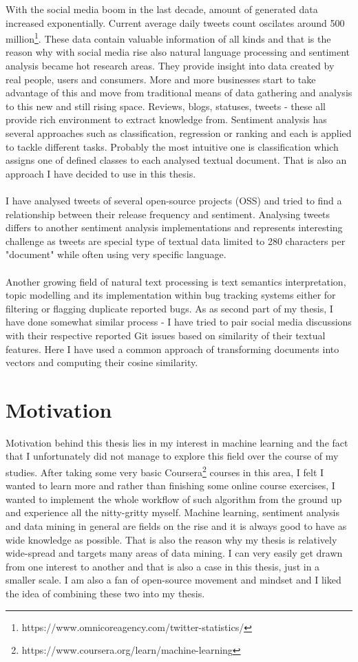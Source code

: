 With the social media boom in the last decade, amount of generated data increased exponentially. Current average daily tweets count oscilates around 500 million\footnote{https://www.omnicoreagency.com/twitter-statistics/}. These data contain valuable information of all kinds and that is the reason why with social media rise also natural language processing and sentiment analysis became hot research areas. They provide insight into data created by real people, users and consumers. More and more businesses start to take advantage of this and move from traditional means of data gathering and analysis to this new and still rising space. Reviews, blogs, statuses, tweets - these all provide rich environment to extract knowledge from.
Sentiment analysis has several approaches such as classification, regression or ranking and each is applied to tackle different tasks. Probably the most intuitive one is classification which assigns one of defined classes to each analysed textual document. That is also an approach I have decided to use in this thesis. \\
\\
I have analysed tweets of several open-source projects (OSS) and tried to find a relationship between their release frequency and sentiment. Analysing tweets differs to another sentiment analysis implementations and represents interesting challenge as tweets are special type of textual data limited to 280 characters per "document" while often using very specific language.\\
\\
Another growing field of natural text processing is text semantics interpretation, topic modelling and its implementation within bug tracking systems either for filtering or flagging duplicate reported bugs. As as second part of my thesis, I have done somewhat similar process - I have tried to pair social media discussions with their respective reported Git issues based on similarity of their textual features. Here I have used a common approach of transforming documents into vectors and computing their cosine similarity.

\section{Motivation}
Motivation behind this thesis lies in my interest in machine learning and the fact that I unfortunately did not manage to explore this field over the course of my studies. After taking some very basic Coursera\footnote{https://www.coursera.org/learn/machine-learning} courses in this area, I felt I wanted to learn more and rather than finishing some online course exercises, I wanted to implement the whole workflow of such algorithm from the ground up and experience all the nitty-gritty myself. Machine learning, sentiment analysis and data mining in general are fields on the rise and it is always good to have as wide knowledge as possible. That is also the reason why my thesis is relatively wide-spread and targets many areas of data mining. I can very easily get drawn from one interest to another and that is also a case in this thesis, just in a smaller scale. I am also a fan of open-source movement and mindset and I liked the idea of combining these two into my thesis.